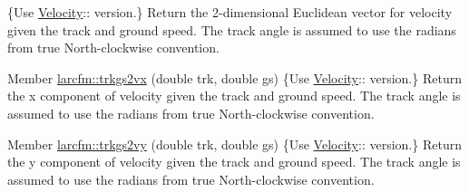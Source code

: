 \begin{DoxyRefList}
%
\{Use \mbox{\hyperlink{classlarcfm_1_1_velocity}{Velocity}}\+:\+: version.\} Return the 2-\/dimensional Euclidean vector for velocity given the track and ground speed. The track angle is assumed to use the radians from true North-\/clockwise convention.  
\item[Member \mbox{\hyperlink{namespacelarcfm_ad09afcbc6b27366baa702ec9312b7c80}{larcfm\+::trkgs2vx}} (double trk, double gs)]\label{deprecated__deprecated000040}%
%
\{Use \mbox{\hyperlink{classlarcfm_1_1_velocity}{Velocity}}\+:\+: version.\} Return the x component of velocity given the track and ground speed. The track angle is assumed to use the radians from true North-\/clockwise convention.  
\item[Member \mbox{\hyperlink{namespacelarcfm_a0b984b0883f125ef60821b562b635a05}{larcfm\+::trkgs2vy}} (double trk, double gs)]\label{deprecated__deprecated000041}%
%
\{Use \mbox{\hyperlink{classlarcfm_1_1_velocity}{Velocity}}\+:\+: version.\} Return the y component of velocity given the track and ground speed. The track angle is assumed to use the radians from true North-\/clockwise convention. 
\end{DoxyRefList}